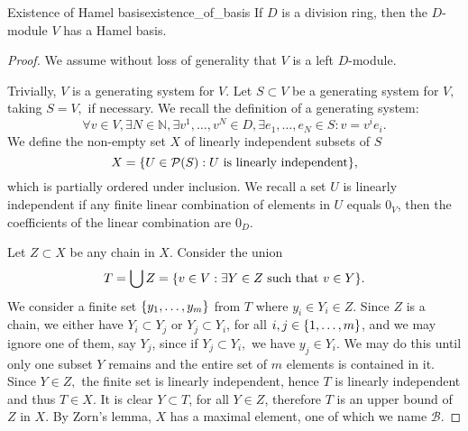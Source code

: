 \begin{theorem}{Existence of Hamel basis}{existence_of_basis}
    If \(D\) is a division ring, then the \(D\)-module \(V\) has a Hamel basis.
\end{theorem}
\begin{proof}
    We assume without loss of generality that \(V\) is a left \(D\)-module.

    Trivially, \(V\) is a generating system for \(V\). Let \(S \subset V\) be a generating system for \(V,\) taking \(S = V,\) if necessary. We recall the definition of a generating system:
    \begin{equation*}
        \forall v \in V, \exists N \in \mathbb{N}, \exists v^1, \dots, v^N \in D, \exists e_1, \dots, e_N \in S : v = v^i e_i.
    \end{equation*}
    We define the non-empty set \(X\) of linearly independent subsets of \(S\)
    \begin{equation*}
        X = \set*{U \in \mathcal{P}(S) : U\text{ is linearly independent}},
    \end{equation*}
    which is partially ordered under inclusion. We recall a set \(U\) is linearly independent if any finite linear combination of elements in \(U\) equals \(0_V\), then the coefficients of the linear combination are \(0_D\).

    Let \(Z \subset X\) be any chain in \(X\). Consider the union
    \begin{equation*}
        T = \bigcup Z = \set*{v \in V : \exists Y \in Z \text{ such that } v \in Y}.
    \end{equation*}
    We consider a finite set \(\set*{y_1, \dots, y_m}\) from \(T\) where \(y_i \in Y_i \in Z\). Since \(Z\) is a chain, we either have \(Y_i \subset Y_j\) or \(Y_j \subset Y_i\), for all \(i, j \in \set{1, \dots, m}\), and we may ignore one of them, say \(Y_j\), since if \(Y_j \subset Y_i,\) we have \(y_j \in Y_i.\) We may do this until only one subset \(Y\) remains and the entire set of \(m\) elements is contained in it. Since \(Y \in Z,\) the finite set is linearly independent, hence \(T\) is linearly independent and thus \(T \in X\). It is clear \(Y \subset T\), for all \(Y \in Z\), therefore \(T\) is an upper bound of \(Z\) in \(X\). By Zorn's lemma, \(X\) has a maximal element, one of which we name \(\mathcal{B}\).


\end{proof}
